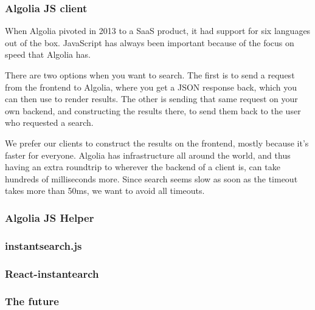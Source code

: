\subsubsection{Algolia JS client} %
\label{ssub:algolia_js_client}

When Algolia pivoted\cite{algolia-blog-saas} in 2013 to a SaaS product, it had support\cite{algolia-blog-lauch} for six languages out of the box. JavaScript has always been important because of the focus on speed that Algolia has.

There are two options when you want to search. The first is to send a request from the frontend to Algolia, where you get a JSON response back, which you can then use to render results. The other is sending that same request on your own backend, and constructing the results there, to send them back to the user who requested a search.

We prefer our clients to construct the results on the frontend, mostly because it's faster for everyone. Algolia has infrastructure\cite{algolia-infra} all around the world, and thus having an extra roundtrip to wherever the backend of a client is, can take hundreds of milliseconds more. Since search seems slow as soon as the timeout takes more than 50ms, we want to avoid all timeouts.


\subsubsection{Algolia JS Helper} %
\label{ssub:algolia_js_helper}


\subsubsection{instantsearch.js} %
\label{ssub:instantsearch_js}


\subsubsection{React-instantearch} %
\label{ssub:react_instantearch}


\subsubsection{The future} %
\label{ssub:the_future}


